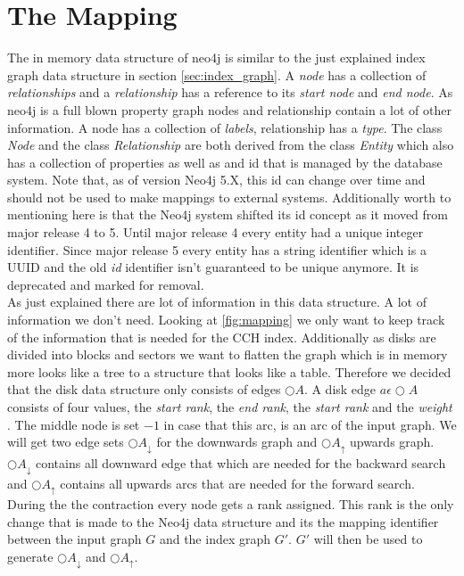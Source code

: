 \section{The Mapping}\label{sec:mapping}

The in memory data structure of neo4j is similar to the just explained index graph data structure in section \ref{sec:index_graph}. A \textit{node} has a collection of \textit{relationships} and a \textit{relationship} has a reference to its \textit{start node} and \textit{end node}.
As neo4j is a full blown property graph nodes and relationship contain a lot of other information. A node has a collection of \textit{labels}, relationship has a \textit{type}. The class \textit{Node} and the class \textit{Relationship} 
are both derived from the class \textit{Entity} which also has a collection of properties as well as and id that is managed by the database system. Note that, as of version Neo4j 5.X, this id can change over time and should not be used to make mappings to external systems. Additionally 
worth to mentioning here is that the Neo4j system shifted its id concept as it moved from major release 4 to 5. Until major release 4 every entity had a unique integer identifier. Since major release 5 every entity has a string identifier which is a UUID and the old \textit{id} identifier
isn't guaranteed to be unique anymore. It is deprecated and marked for removal.
\\
As just explained there are lot of information in this data structure. A lot of information we don't need. Looking at \ref{fig:mapping} we only want to keep track of the information that is needed for the CCH index. Additionally as disks are
divided  into blocks and sectors we want to flatten the graph which is in memory more looks like a tree to a structure that looks like a table. Therefore we decided that the disk data structure only consists of edges $\bigcirc A$. A disk edge $a \epsilon \bigcirc A$ consists of four values, 
the \textit{start rank}, the \textit{end rank}, the \textit{start rank} and the \textit{weight} . The middle node is set $-1$ in case that this arc, is an arc of the input graph. We will get two edge sets $\bigcirc A_\downarrow$ for the downwards graph and $\bigcirc A_\uparrow $ upwards graph.
$\bigcirc A_\downarrow$ contains all downward edge that which are needed for the backward search and $\bigcirc A_\uparrow$ contains all upwards arcs that are needed for the forward search.
\\
During the the contraction every node gets a rank assigned. This rank is the only change that is made to the Neo4j data structure and its the mapping identifier between the input graph $G$ and the index graph $G'$. $G'$ will then be used to generate $\bigcirc A_\downarrow$ and $\bigcirc A_\uparrow$.


